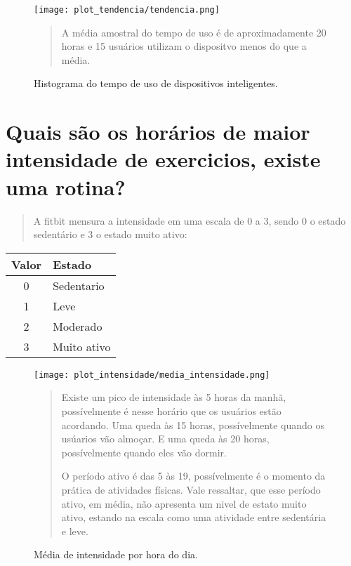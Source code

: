 \documentclass[a4paper, oneside]{report}
\begin{document}
\begin{figure}[h]
\centering %
\texttt{[image: plot\_tendencia/tendencia.png]} 
\caption{Histograma do tempo de uso de dispositivos inteligentes.}
\label{figura: Figura 11}

\begin{quotation}
A média amostral do tempo de uso é de aproximadamente 20 horas e 15 usuários utilizam o dispositvo menos do que a média.

\end{quotation}
\end{figure}



\chapter*{Quais são os horários de maior intensidade de exercicios, existe uma rotina?}
\begin{quotation}
    A fitbit mensura a intensidade em uma escala de 0 a 3, sendo 0 o estado sedentário e 3 o estado muito ativo:
\end{quotation}

\centering
\begin{tabular}{|c|l|} \hline
Valor & Estado \\ \hline
0 & Sedentario \\ \hline
1 & Leve \\ \hline
2 & Moderado\\ \hline
3 & Muito ativo\\ \hline
\end{tabular}

\begin{figure}[h]
\centering %
\texttt{[image: plot\_intensidade/media\_intensidade.png]} 
\caption{Média de intensidade por hora do dia.}
\label{figura: Figura 7}

\begin{quotation}
Existe um pico de intensidade às 5 horas da manhã, possívelmente é nesse horário que os usuários estão acordando. Uma queda às 15 horas, possívelmente quando os usúarios vão almoçar. E uma queda às 20 horas, possívelmente quando eles vão dormir.

O período ativo é das 5 às 19, possívelmente é o momento da prática de atividades físicas. Vale ressaltar, que esse período ativo, em média, não apresenta um nivel de estato muito ativo, estando na escala como uma atividade entre sedentária e leve.
\end{quotation}
\end{figure}
\end{document}
